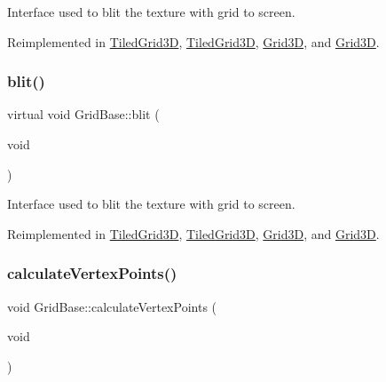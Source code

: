 Interface used to blit the texture with grid to screen. 

Reimplemented in \hyperlink{classTiledGrid3D_af7e3ffa4032b6aba3f5e177cd0c24459}{Tiled\+Grid3D}, \hyperlink{classTiledGrid3D_a0c3897a09f8eba5111ec263accdc4ce6}{Tiled\+Grid3D}, \hyperlink{classGrid3D_af09d4f416ea51976f1ab19688716b3b2}{Grid3D}, and \hyperlink{classGrid3D_afbf54ef1bb003967ed93ec5c238716f0}{Grid3D}.

\mbox{\label{classGridBase_a269a0e153a09131b8020add699a74166}} 
\subsubsection{\texorpdfstring{blit()}{blit()}\hspace{0.1cm}{\footnotesize\ttfamily [2/2]}}
{\footnotesize\ttfamily virtual void Grid\+Base\+::blit (\begin{DoxyParamCaption}\item[{void}]{ }\end{DoxyParamCaption})\hspace{0.3cm}{\ttfamily [virtual]}}

Interface used to blit the texture with grid to screen. 

Reimplemented in \hyperlink{classTiledGrid3D_af7e3ffa4032b6aba3f5e177cd0c24459}{Tiled\+Grid3D}, \hyperlink{classTiledGrid3D_a0c3897a09f8eba5111ec263accdc4ce6}{Tiled\+Grid3D}, \hyperlink{classGrid3D_af09d4f416ea51976f1ab19688716b3b2}{Grid3D}, and \hyperlink{classGrid3D_afbf54ef1bb003967ed93ec5c238716f0}{Grid3D}.

\mbox{\label{classGridBase_a339fdde120c6f38f6bc2e78d3bb7636f}} 
\subsubsection{\texorpdfstring{calculate\+Vertex\+Points()}{calculateVertexPoints()}\hspace{0.1cm}{\footnotesize\ttfamily [1/2]}}
{\footnotesize\ttfamily void Grid\+Base\+::calculate\+Vertex\+Points (\begin{DoxyParamCaption}\item[{void}]{ }\end{DoxyParamCaption})\hspace{0.3cm}{\ttfamily [virtual]}}

